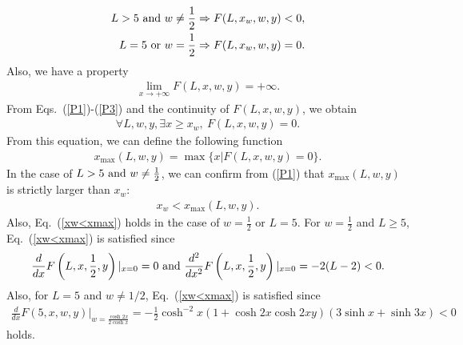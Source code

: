 \documentclass[prl,twocolumn,superscriptaddress,nofootinbib]{revtex4}
\def\U#1{{\rm #1}}
\begin{document}
\begin{widetext}
\begin{align}
          L>5~\U{and}~w\neq\frac{1}{2}\Rightarrow F(L,x_w,w,y)<0,\label{P1}\\
                    L=5~\U{or}~w=\frac{1}{2}\Rightarrow F(L,x_w,w,y)=0.
          \label{P2}
        \end{align}
        Also, we have a property
        \begin{align}
          \lim_{x\to+\infty}F(L,x,w,y)=+\infty.
          \label{P3}
          \end{align}
        From Eqs.~(\ref{P1})-(\ref{P3}) and the continuity of $F(L,x,w,y)$, we obtain
        \begin{align}
\forall L, w, y, \exists x\geq x_w,~F(L,x,w,y)=0. 
\end{align}
        From this equation, we can define the following function
        \begin{align}
          x_{\max}(L,w,y)=\max\{x|F(L,x,w,y)=0\}.
          \label{xmax}
          \end{align}
        In the case of $L>5~\U{and}~w\neq\frac{1}{2}$, we can confirm from (\ref{P1}) that $x_{\max}(L,w,y)$ is strictly larger than
        $x_w$: 
        \begin{align}
          x_w<x_{\max}(L,w,y).
          \label{xw<xmax}
        \end{align}
          Also, Eq.~(\ref{xw<xmax}) holds in the case of $w=\frac{1}{2}$ or $L=5$. 
        For $w=\frac{1}{2}$ and $L\ge5$, Eq.~(\ref{xw<xmax}) is satisfied since
        \begin{align}
          \frac{d}{dx}F\left(L,x,\frac{1}{2},y\right)|_{x=0}=0~\U{and}~
          \frac{d^2}{dx^2}F\left(L,x,\frac{1}{2},y\right)|_{x=0}=-2(L-2)<0.
          \end{align}
Also, for $L=5$ and $w\neq1/2$, Eq.~(\ref{xw<xmax}) is satisfied since
        \begin{align}
          \frac{d}{dx}F(5,x,w,y)|_{w=\frac{\cosh{2x}}{2\cosh{x}}}=-\frac{1}{2}\cosh^{-2}x(1+\cosh{2x}\cosh{2xy})(3\sinh{x}+\sinh{3x})<0
\end{align}
        holds.
        

\end{widetext}
\end{document}
